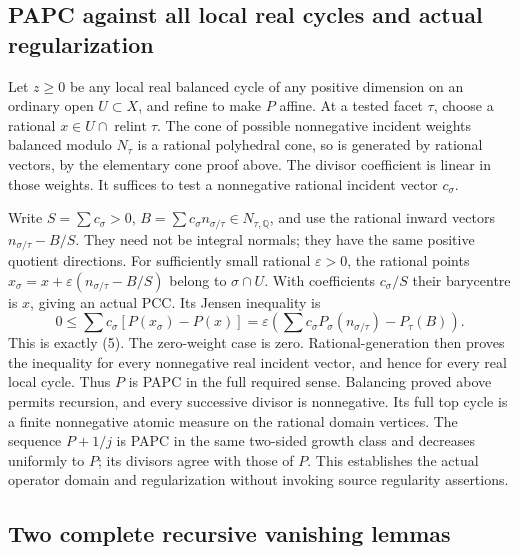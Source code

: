 \documentclass[
  11pt,
]{article}
\begin{document}
\subsection{PAPC against all local real cycles and actual
regularization}\label{papc-against-all-local-real-cycles-and-actual-regularization}

Let \(z\geq0\) be any local real balanced cycle of any positive
dimension on an ordinary open \(U\subset X\), and refine to make \(P\)
affine. At a tested facet \(\tau\), choose a rational
\(x\in U\cap\operatorname{relint}\tau\). The cone of possible
nonnegative incident weights balanced modulo \(N_\tau\) is a rational
polyhedral cone, so is generated by rational vectors, by the elementary
cone proof above. The divisor coefficient is linear in those weights. It
suffices to test a nonnegative rational incident vector \(c_\sigma\).

Write \(S=\sum c_\sigma>0\),
\(B=\sum c_\sigma n_{\sigma/\tau}\in N_{\tau,\mathbb{Q}}\), and use the
rational inward vectors \(n_{\sigma/\tau}-B/S\). They need not be
integral normals; they have the same positive quotient directions. For
sufficiently small rational \(\varepsilon>0\), the rational points
\(x_\sigma=x+\varepsilon(n_{\sigma/\tau}-B/S)\) belong to
\(\sigma\cap U\). With coefficients \(c_\sigma/S\) their barycentre is
\(x\), giving an actual PCC. Its Jensen inequality is \[
 0\leq\sum c_\sigma[P(x_\sigma)-P(x)]
       =\varepsilon\left(\sum c_\sigma P_\sigma(n_{\sigma/\tau})-P_\tau(B)\right).
\] This is exactly (5). The zero-weight case is zero.
Rational-generation then proves the inequality for every nonnegative
real incident vector, and hence for every real local cycle. Thus \(P\)
is PAPC in the full required sense. Balancing proved above permits
recursion, and every successive divisor is nonnegative. Its full top
cycle is a finite nonnegative atomic measure on the rational domain
vertices. The sequence \(P+1/j\) is PAPC in the same two-sided growth
class and decreases uniformly to \(P\); its divisors agree with those of
\(P\). This establishes the actual operator domain and regularization
without invoking source regularity assertions.

\subsection{Two complete recursive vanishing
lemmas}\label{two-complete-recursive-vanishing-lemmas}
\end{document}
